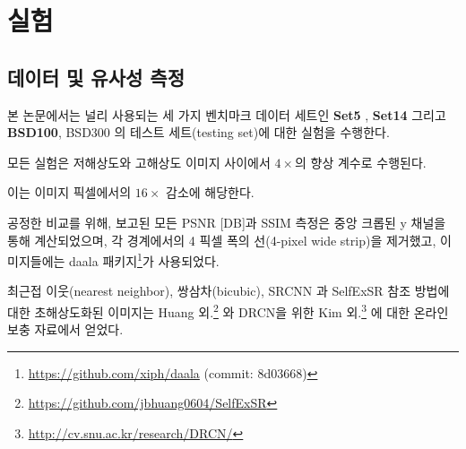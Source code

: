\documentclass[10pt,twocolumn,letterpaper]{article}
\newcommand{\kor}[1]{#1}
\newcommand{\eng}[1]{}
\begin{document}
%
\section{\eng{Experiments}\kor{실험}}
\label{sec:experiments}
\subsection{\eng{Data and similarity measures}\kor{데이터 및 유사성 측정}}
\label{subsec:data}
\eng{
We perform experiments on three widely used benchmark datasets \textbf{Set5} \cite{bevilacqua2012low}, \textbf{Set14} \cite{zeyde2012single} and \textbf{BSD100}, the testing set of BSD300 \cite{MartinFTM01}.
}\kor{
본 논문에서는 널리 사용되는 세 가지 벤치마크 데이터 세트인 \textbf{Set5} \cite{bevilacqua2012low}, \textbf{Set14} \cite{zeyde2012single} 그리고 \textbf{BSD100}, BSD300 \cite{MartinFTM01}의 테스트 세트(testing set)에 대한 실험을 수행한다.
} \eng{
All experiments are performed with a scale factor of $4\times$ between low- and high-resolution images.
}\kor{
모든 실험은 저해상도와 고해상도 이미지 사이에서 $4\times$의 향상 계수로 수행된다.
} \eng{
This corresponds to a $16\times$ reduction in image pixels.
}\kor{
이는 이미지 픽셀에서의 $16\times$ 감소에 해당한다.
} \eng{
For fair comparison, all reported \ac{PSNR} [dB] and \ac{SSIM} \cite{Wang2004} measures were calculated on the y-channel of center-cropped, removal of a 4-pixel wide strip from each border, images using the daala package\footnote{\url{https://github.com/xiph/daala} (commit: 8d03668)}.
}\kor{
공정한 비교를 위해, 보고된 모든 \ac{PSNR} [DB]과 \ac{SSIM} \cite{Wang2004} 측정은 중앙 크롭된 y 채널을 통해 계산되었으며, 각 경계에서의 4 픽셀 폭의 선(4-pixel wide strip)을 제거했고, 이미지들에는 daala 패키지\footnote{\url{https://github.com/xiph/daala} (commit: 8d03668)}가 사용되었다.
} \eng{
Super-resolved images for the reference methods, including nearest neighbor, bicubic, SRCNN \cite{dong2014learning} and SelfExSR \cite{Huang15selfexemplars}, were obtained from online material supplementary to Huang et al.\footnote{\url{https://github.com/jbhuang0604/SelfExSR}} \cite{Huang15selfexemplars} and for DRCN from Kim et al.\footnote{\url{http://cv.snu.ac.kr/research/DRCN/}} \cite{kim2016deeply}.
}\kor{
최근접 이웃(nearest neighbor), 쌍삼차(bicubic), SRCNN \cite{dong2014learning}과 SelfExSR \cite{Huang15selfexemplars} 참조 방법에 대한 초해상도화된 이미지는 Huang 외.\footnote{\url{https://github.com/jbhuang0604/SelfExSR}} \cite{Huang15selfexemplars}와 DRCN을 위한 Kim 외.\footnote{\url{http://cv.snu.ac.kr/research/DRCN/}} \cite{kim2016deeply}에 대한 온라인 보충 자료에서 얻었다.
}
\end{document}
